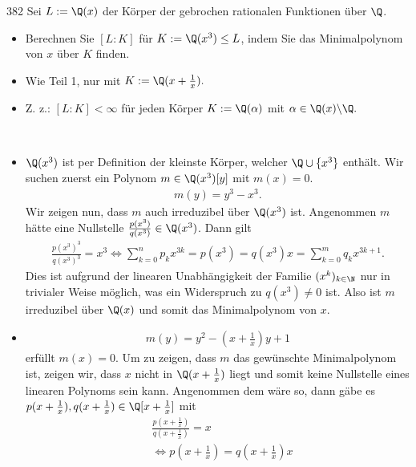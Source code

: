 \begin{algebraUE}{382}
  Sei $L := \Q(x)$ der Körper der gebrochen rationalen Funktionen über $\Q$.
  \begin{itemize}
      \item Berechnen Sie $[L:K]$ für $K:= \Q(x^3) \leq L$, indem Sie das Minimalpolynom von $x$ über $K$ finden.
      \item Wie Teil 1, nur mit $K := \Q(x+\frac{1}{x}).$
      \item Z. z.: $[L:K] < \infty$ für jeden Körper $K := \Q(\alpha)$ mit $\alpha \in \Q(x) \backslash \Q.$
  \end{itemize}
\end{algebraUE}

\begin{solution}
\leavevmode \\
\begin{itemize}
  \item $\Q(x^3)$ ist per Definition der kleinste Körper, welcher $\Q \cup \{x^3\}$
  enthält.
  Wir suchen zuerst ein Polynom $m \in \Q(x^3)[y]$ mit $m(x) = 0$.
    \begin{align*}
        m(y) = y^3 - x^3.
    \end{align*}
    Wir zeigen nun, dass $m$ auch irreduzibel über $\Q(x^3)$ ist. Angenommen $m$
    hätte eine Nullstelle  $\frac{p(x^3)}{q(x^3)} \in \Q(x^3)$. Dann gilt
    \begin{align*}
      \frac{p(x^3)^3}{q(x^3)^3} = x^3
      \iff \sum_{k=0}^np_kx^{3k} = p(x^3) = q(x^3)x = \sum_{k=0}^mq_kx^{3k+1}.
    \end{align*}
    Dies ist aufgrund der linearen Unabhängigkeit der Familie $(x^k)_{k \in \N}$
    nur in trivialer Weise möglich, was ein Widerspruch zu $q(x^3) \neq 0$ ist.
    Also ist $m$ irreduzibel über $\Q(x)$ und somit das Minimalpolynom von $x$.
  \item \begin{align*}
    m(y) = y^2 - (x + \frac{1}{x})y + 1
  \end{align*}
  erfüllt $m(x) = 0$. Um zu zeigen, dass $m$ das gewünschte Minimalpolynom ist,
  zeigen wir, dass $x$ nicht in $\Q(x + \frac{1}{x})$ liegt und somit keine
  Nullstelle eines linearen Polynoms sein kann. Angenommen dem wäre so, dann gäbe
  es $p(x+\frac{1}{x}),q(x+\frac{1}{x}) \in \Q[x+\frac{1}{x}]$ mit
  \begin{align*}
    &\frac{p(x+\frac{1}{x})}{q(x+\frac{1}{x})} = x \\
    &\iff p(x+\frac{1}{x}) = q(x + \frac{1}{x})x \\

\end{align*}
\end{itemize}
\end{solution}
